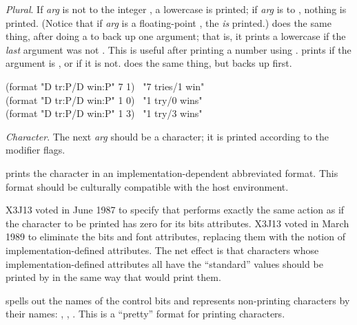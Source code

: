 \begin{flushdesc}
\item[\cd{{\Xtilde}P}]
{\it Plural}.
If {\it arg} is not  to the integer , a lowercase  is
printed; if {\it arg} is  to , nothing is printed.  (Notice
that if {\it arg} is a floating-point , the  {\it is}
printed.)
 does the same thing, after doing a \cd{{\Xtilde}:*} to back up one argument;
that is, it prints a lowercase  if the {\it last} argument was not
.  This is useful after printing a number using .
 prints  if the argument is , or  if it is
not.   does the same thing, but backs up first.
\begin{lisp}
(format {\false} "{\Xtilde}D tr{\Xtilde}:{\Xatsign}P/{\Xtilde}D win{\Xtilde}:P" 7 1) \EV\ "7 tries/1 win" \\
(format {\false} "{\Xtilde}D tr{\Xtilde}:{\Xatsign}P/{\Xtilde}D win{\Xtilde}:P" 1 0) \EV\ "1 try/0 wins" \\
(format {\false} "{\Xtilde}D tr{\Xtilde}:{\Xatsign}P/{\Xtilde}D win{\Xtilde}:P" 1 3) \EV\ "1 try/3 wins"
\end{lisp}

\item[\cd{{\Xtilde}C}]
{\it Character}.  The next {\it arg} should be a character; it is printed
according to the modifier flags.

\begin{obsolete}
 prints the character in an implementation-dependent
abbreviated format.  This format should be culturally compatible with the
host environment.
\end{obsolete}

\begin{newer}
X3J13 voted in June 1987  to specify that
 performs exactly the same action as 
if the character to be printed has zero for its bits attributes.
X3J13 voted in March 1989  to eliminate
the bits and font attributes, replacing them with the notion of
implementation-defined attributes.  The net effect is that characters
whose implementation-defined attributes all have the ``standard''
values should be printed by  in the same way
that  would print them.
\end{newer}

 spells out the names of the control bits
and represents non-printing characters
by their names: , , .
This is a ``pretty'' format for printing characters.


\end{flushdesc}
